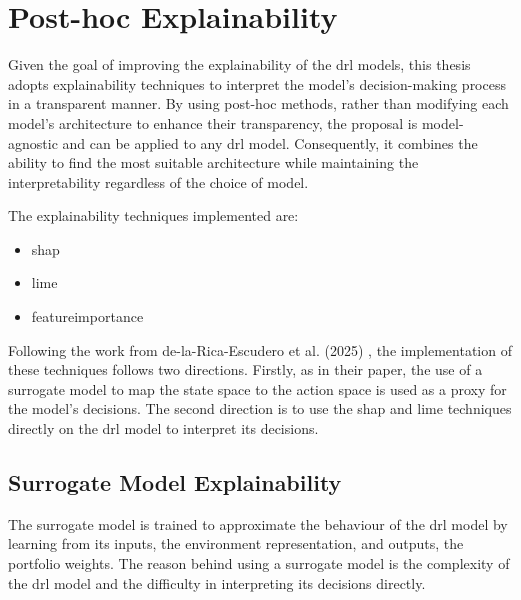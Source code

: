 \section{Post-hoc Explainability} \label{sec:post_hoc_explainability}

Given the goal of improving the explainability of the \acrshort{drl} models, this thesis adopts explainability techniques to interpret the model's decision-making process in a transparent manner. By using post-hoc methods, rather than modifying each model's architecture to enhance their transparency, the proposal is model-agnostic and can be applied to any \acrshort{drl} model. Consequently, it combines the ability to find the most suitable architecture while maintaining the interpretability regardless of the choice of model. 

The explainability techniques implemented are: 
\begin{itemize}
    \item \acrfull{shap}
    \item \acrfull{lime}
    \item \Gls{featureimportance}
\end{itemize}

Following the work from de-la-Rica-Escudero et al. (2025) \cite{de-La-Rica-Escudero2025}, the implementation of these techniques follows two directions. Firstly, as in their paper, the use of a surrogate model to map the state space to the action space is used as a proxy for the model's decisions. The second direction is to use the \acrshort{shap} and \acrshort{lime} techniques directly on the \acrshort{drl} model to interpret its decisions.

\subsection{Surrogate Model Explainability} \label{subsec:surrogate_model_explainability}

The surrogate model is trained to approximate the behaviour of the \acrshort{drl} model by learning from its inputs, the environment representation, and outputs, the portfolio weights. The reason behind using a surrogate model is the complexity of the \acrshort{drl} model and the difficulty in interpreting its decisions directly. 

